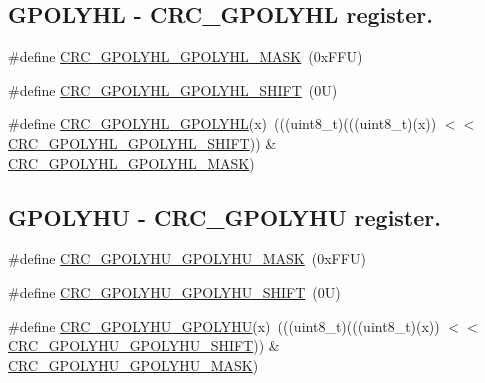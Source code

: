 \subsection*{G\+P\+O\+L\+Y\+HL -\/ C\+R\+C\+\_\+\+G\+P\+O\+L\+Y\+HL register.}
\begin{DoxyCompactItemize}
\item 
\#define \mbox{\hyperlink{group___c_r_c___register___masks_ga92b941ef781b6023d61bc2af7f0b1818}{C\+R\+C\+\_\+\+G\+P\+O\+L\+Y\+H\+L\+\_\+\+G\+P\+O\+L\+Y\+H\+L\+\_\+\+M\+A\+SK}}~(0x\+F\+F\+U)
\item 
\#define \mbox{\hyperlink{group___c_r_c___register___masks_gaffbf0c35e87ea7a9650c9a049a08560c}{C\+R\+C\+\_\+\+G\+P\+O\+L\+Y\+H\+L\+\_\+\+G\+P\+O\+L\+Y\+H\+L\+\_\+\+S\+H\+I\+FT}}~(0\+U)
\item 
\#define \mbox{\hyperlink{group___c_r_c___register___masks_ga2620d4495edbf2e97ad905e12bf3e0a5}{C\+R\+C\+\_\+\+G\+P\+O\+L\+Y\+H\+L\+\_\+\+G\+P\+O\+L\+Y\+HL}}(x)~(((uint8\+\_\+t)(((uint8\+\_\+t)(x)) $<$$<$ \mbox{\hyperlink{group___c_r_c___register___masks_gaffbf0c35e87ea7a9650c9a049a08560c}{C\+R\+C\+\_\+\+G\+P\+O\+L\+Y\+H\+L\+\_\+\+G\+P\+O\+L\+Y\+H\+L\+\_\+\+S\+H\+I\+FT}})) \& \mbox{\hyperlink{group___c_r_c___register___masks_ga92b941ef781b6023d61bc2af7f0b1818}{C\+R\+C\+\_\+\+G\+P\+O\+L\+Y\+H\+L\+\_\+\+G\+P\+O\+L\+Y\+H\+L\+\_\+\+M\+A\+SK}})
\end{DoxyCompactItemize}
\subsection*{G\+P\+O\+L\+Y\+HU -\/ C\+R\+C\+\_\+\+G\+P\+O\+L\+Y\+HU register.}
\begin{DoxyCompactItemize}
\item 
\#define \mbox{\hyperlink{group___c_r_c___register___masks_gac0f3f7a896e1ef279b948d778274cf04}{C\+R\+C\+\_\+\+G\+P\+O\+L\+Y\+H\+U\+\_\+\+G\+P\+O\+L\+Y\+H\+U\+\_\+\+M\+A\+SK}}~(0x\+F\+F\+U)
\item 
\#define \mbox{\hyperlink{group___c_r_c___register___masks_ga448d4b6c4e930f1c84294da6607faac4}{C\+R\+C\+\_\+\+G\+P\+O\+L\+Y\+H\+U\+\_\+\+G\+P\+O\+L\+Y\+H\+U\+\_\+\+S\+H\+I\+FT}}~(0\+U)
\item 
\#define \mbox{\hyperlink{group___c_r_c___register___masks_ga3a5bf9b2f9fae47e0e669010c130ade2}{C\+R\+C\+\_\+\+G\+P\+O\+L\+Y\+H\+U\+\_\+\+G\+P\+O\+L\+Y\+HU}}(x)~(((uint8\+\_\+t)(((uint8\+\_\+t)(x)) $<$$<$ \mbox{\hyperlink{group___c_r_c___register___masks_ga448d4b6c4e930f1c84294da6607faac4}{C\+R\+C\+\_\+\+G\+P\+O\+L\+Y\+H\+U\+\_\+\+G\+P\+O\+L\+Y\+H\+U\+\_\+\+S\+H\+I\+FT}})) \& \mbox{\hyperlink{group___c_r_c___register___masks_gac0f3f7a896e1ef279b948d778274cf04}{C\+R\+C\+\_\+\+G\+P\+O\+L\+Y\+H\+U\+\_\+\+G\+P\+O\+L\+Y\+H\+U\+\_\+\+M\+A\+SK}})
\end{DoxyCompactItemize}
